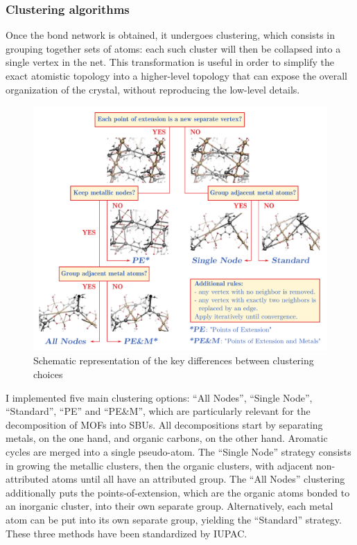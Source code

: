 \documentclass[main.tex]{subfiles}
\begin{document}
\subsubsection{Clustering algorithms}
\label{clusteringalgorithms}

Once the bond network is obtained, it undergoes clustering, which consists in grouping together sets of atoms: each such cluster will then be collapsed into a single vertex in the net. This transformation is useful in order to simplify the exact atomistic topology into a higher-level topology that can expose the overall organization of the crystal, without reproducing the low-level details. %

\begin{figure}
	\centering
	\includegraphics[width=\linewidth]{figures/topology/clustering.pdf}

	\caption{Schematic representation of the key differences between clustering choices}\label{fig:clustering}
\end{figure}

I implemented five main clustering options: ``All Nodes'', ``Single Node'', ``Standard'', ``PE'' and ``PE\&M'', which are particularly relevant for the decomposition of MOFs into SBUs. All decompositions start by separating metals, on the one hand, and organic carbons, on the other hand. Aromatic cycles are merged into a single pseudo-atom. The ``Single Node'' strategy\autocite{IUPAC_SBU} consists in growing the metallic clusters, then the organic clusters, with adjacent non-attributed atoms until all have an attributed group. The ``All Nodes'' clustering\autocite{IUPAC_SBU} additionally puts the points-of-extension\autocite{UnifiedTopology,YaghiRodMOFs}, which are the organic atoms bonded to an inorganic cluster, into their own separate group. Alternatively, each metal atom can be put into its own separate group, yielding the ``Standard'' strategy. These three methods have been standardized by IUPAC\autocite{IUPAC_SBU}.
\end{document}

